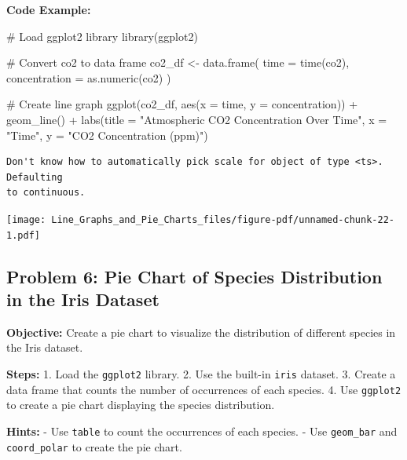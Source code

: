 \documentclass[
  letterpaper,
  DIV=11,
  numbers=noendperiod]{scrreprt}
\newenvironment{Shaded}{\begin{snugshade}}{\end{snugshade}}
\newcommand{\AttributeTok}[1]{\textcolor[rgb]{0.40,0.45,0.13}{#1}}
\newcommand{\CommentTok}[1]{\textcolor[rgb]{0.37,0.37,0.37}{#1}}
\newcommand{\FunctionTok}[1]{\textcolor[rgb]{0.28,0.35,0.67}{#1}}
\newcommand{\NormalTok}[1]{\textcolor[rgb]{0.00,0.23,0.31}{#1}}
\newcommand{\OtherTok}[1]{\textcolor[rgb]{0.00,0.23,0.31}{#1}}
\newcommand{\SpecialCharTok}[1]{\textcolor[rgb]{0.37,0.37,0.37}{#1}}
\newcommand{\StringTok}[1]{\textcolor[rgb]{0.13,0.47,0.30}{#1}}
\begin{document}
\textbf{Code Example:}

\begin{Shaded}
\begin{Highlighting}[]
\CommentTok{\# Load ggplot2 library}
\FunctionTok{library}\NormalTok{(ggplot2)}

\CommentTok{\# Convert co2 to data frame}
\NormalTok{co2\_df }\OtherTok{\textless{}{-}} \FunctionTok{data.frame}\NormalTok{(}
  \AttributeTok{time =} \FunctionTok{time}\NormalTok{(co2),}
  \AttributeTok{concentration =} \FunctionTok{as.numeric}\NormalTok{(co2)}
\NormalTok{)}

\CommentTok{\# Create line graph}
\FunctionTok{ggplot}\NormalTok{(co2\_df, }\FunctionTok{aes}\NormalTok{(}\AttributeTok{x =}\NormalTok{ time, }\AttributeTok{y =}\NormalTok{ concentration)) }\SpecialCharTok{+}
  \FunctionTok{geom\_line}\NormalTok{() }\SpecialCharTok{+}
  \FunctionTok{labs}\NormalTok{(}\AttributeTok{title =} \StringTok{"Atmospheric CO2 Concentration Over Time"}\NormalTok{,}
       \AttributeTok{x =} \StringTok{"Time"}\NormalTok{,}
       \AttributeTok{y =} \StringTok{"CO2 Concentration (ppm)"}\NormalTok{)}
\end{Highlighting}
\end{Shaded}

\begin{verbatim}
Don't know how to automatically pick scale for object of type <ts>. Defaulting
to continuous.
\end{verbatim}

\texttt{[image: Line\_Graphs\_and\_Pie\_Charts\_files/figure-pdf/unnamed-chunk-22-1.pdf]}

\subsection*{Problem 6: Pie Chart of Species Distribution in the Iris
Dataset}\label{problem-6-pie-chart-of-species-distribution-in-the-iris-dataset}

\textbf{Objective:} Create a pie chart to visualize the distribution of
different species in the Iris dataset.

\textbf{Steps:} 1. Load the \texttt{ggplot2} library. 2. Use the
built-in \texttt{iris} dataset. 3. Create a data frame that counts the
number of occurrences of each species. 4. Use \texttt{ggplot2} to create
a pie chart displaying the species distribution.

\textbf{Hints:} - Use \texttt{table} to count the occurrences of each
species. - Use \texttt{geom\_bar} and \texttt{coord\_polar} to create
the pie chart.
\end{document}
